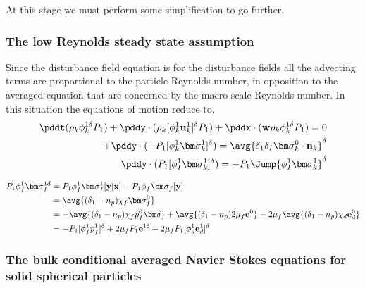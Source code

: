At this stage we must perform some simplification to go further. 
\subsubsection*{The low Reynolds steady state assumption}

Since the disturbance field equation is for the disturbance fields all the advecting terms are proportional to the particle Reynolds number, in opposition to the averaged equation that are concerned by the macro scale Reynolds number. 
In this situation the equations of motion reduce to, 
\begin{align*}
    \pddt (\rho_k \phi_k^{1\delta} P_1 )
    +  \pddy \cdot (\rho_k [
        \phi_k^1 \textbf{u}_k^{1}
        ]^\delta P_1 )
    +  \pddx \cdot (\textbf{w} \rho_k \phi_k^{1\delta} P_1)
    = 0 \\
    +  \pddy\cdot (
    - P_1 [\phi_k^1 \bm\sigma_k^1]^\delta
    )
    = 
    \avg{\delta_1\delta_I \bm\sigma_k^0 \cdot \textbf{n}_k}^\delta\\
    \pddy \cdot (P_1[ \phi_I^1 \bm\sigma_k^1 ]^\delta)= -  P_1 \Jump{\phi_I^1 \bm\sigma_k^1}^\delta
\end{align*}

\begin{align*}
    P_1 \phi_f^1 \bm\sigma_f^{1d} 
    &= 
    P_1 \phi_f^1 \bm\sigma_f^{1}[\textbf{y}|\textbf{x}] 
    - P_1 \phi_f \bm\sigma_f[\textbf{y}]\\
    &= \avg{(\delta_1 - n_p)\chi_f \bm\sigma_f^0}\\
    &= - \avg{(\delta_1 - n_p) \chi_f p_f^0 \bm\delta}
    + \avg{(\delta_1 - n_p)2\mu_f \textbf{e}^0}
    - 2 \mu_f \avg{(\delta_1 - n_p)\chi_d \textbf{e}_d^0}\\
    &=- P_1 [\phi_f^1 p_f^1]^\delta
    + 2\mu_f P_1 \textbf{e}^{1\delta}
    - 2 \mu_f P_1 [\phi_d^1 \textbf{e}_d^1]^\delta
\end{align*}


\subsubsection*{The bulk conditional averaged Navier Stokes equations for solid spherical particles}

